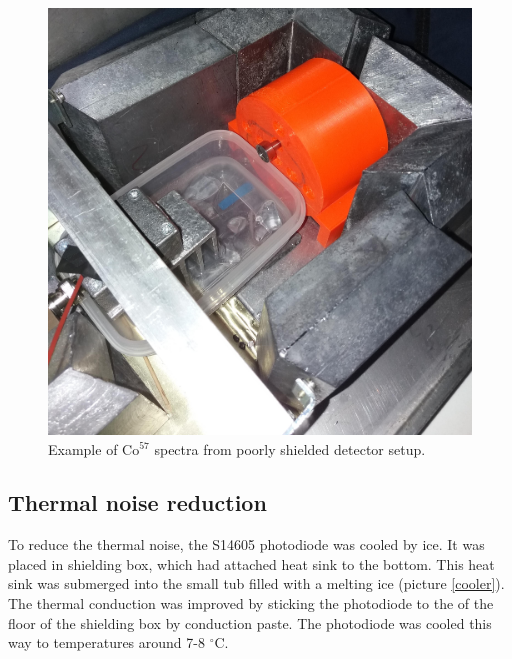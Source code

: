 \begin{figure}[H]
 \centering
 \includegraphics[scale=0.09, angle = 0]{./pictures/chlazeniLedem.jpg}
 \caption{Example of Co$^{57}$ spectra from poorly shielded detector setup.}
 \label{notShielded}
 
\end{figure}



\subsection{Thermal noise reduction}
To reduce the thermal noise, the S14605 photodiode was cooled by ice. It was placed in shielding box, which had attached heat sink to the bottom. This heat sink was submerged into the small tub filled with a melting ice (picture \ref{cooler}). The thermal conduction was improved by sticking the photodiode to the of the floor of the shielding box by conduction paste. The photodiode was cooled this way to temperatures around 7-8 $^\circ$C.



